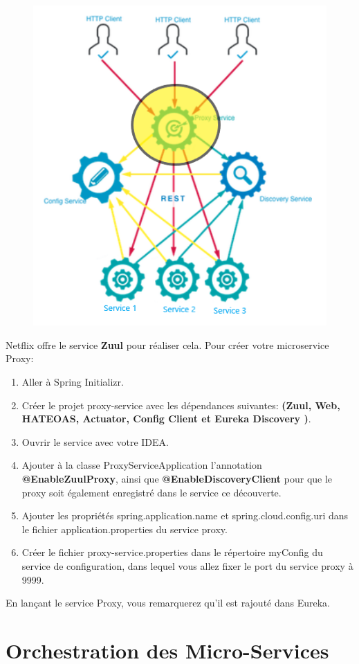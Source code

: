     \begin{figure}[H]
    	\centering
    	\includegraphics[width=0.5\linewidth]{images/tp05}
    	\caption{}
    	\label{fig:tp05}
    \end{figure}
    
    Netflix offre le service \textbf{Zuul} pour réaliser cela. Pour créer votre microservice Proxy:
    \begin{enumerate}
\item    Aller à Spring Initializr.
\item     Créer le projet proxy-service avec les dépendances suivantes: \textbf{(Zuul, Web, HATEOAS, Actuator, Config Client et Eureka Discovery )}.
\item     Ouvrir le service avec votre  IDEA.
\item     Ajouter à la classe ProxyServiceApplication l'annotation \textbf{@EnableZuulProxy}, ainsi que \textbf{@EnableDiscoveryClient} pour que le proxy soit également enregistré dans le service ce découverte.
\item     Ajouter les propriétés spring.application.name et spring.cloud.config.uri dans le fichier application.properties du service proxy.
\item     Créer le fichier proxy-service.properties dans le répertoire myConfig du service de configuration, dans lequel vous allez fixer le port du service proxy à 9999.
 \end{enumerate}


En lançant le service Proxy, vous remarquerez qu'il est rajouté dans Eureka.
    
    
    
    
    
    
    
    
    \section{Orchestration des Micro-Services}
    
